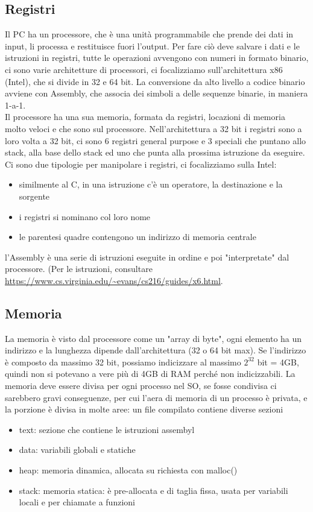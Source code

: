 \documentclass{article}
\begin{document}
\subsection{Registri}
Il PC ha un processore, che è una unità programmabile che prende dei dati in input, li processa e restituisce fuori l'output. Per fare ciò deve salvare i dati e le istruzioni in registri, tutte le operazioni avvengono con numeri in formato binario, ci sono varie architetture di processori, ci focalizziamo sull'architettura x86 (Intel), che si divide in 32 e 64 bit. La conversione da alto livello a codice binario avviene con Assembly, che associa dei simboli a delle sequenze binarie, in maniera 1-a-1.\\ Il processore ha una sua memoria, formata da registri, locazioni di memoria molto veloci e che sono sul processore. Nell'architettura a 32 bit i registri sono a loro volta a 32 bit, ci sono 6 registri general purpose e 3 speciali che puntano allo stack, alla base dello stack ed uno che punta alla prossima istruzione da eseguire. Ci sono due tipologie per manipolare i registri, ci focalizziamo sulla Intel: 
\begin{itemize}
\item similmente al C, in una istruzione c'è un operatore, la destinazione e la sorgente
\item i registri si nominano col loro nome
\item le parentesi quadre contengono un indirizzo di memoria centrale
\end{itemize}
l'Assembly è una serie di istruzioni eseguite in ordine e poi "interpretate" dal processore. (Per le istruzioni, consultare \url{https://www.cs.virginia.edu/~evans/cs216/guides/x6.html}.
\subsection{Memoria}
La memoria è visto dal processore come un "array di byte", ogni elemento ha un indirizzo e la lunghezza dipende dall'architettura (32 o 64 bit max). Se l'indirizzo è composto da massimo 32 bit, possiamo indicizzare al massimo $2^{32}$ bit = 4GB, quindi non si potevano a vere più di 4GB di RAM perché non indicizzabili. La memoria deve essere divisa per ogni processo nel SO, se fosse condivisa ci sarebbero gravi conseguenze, per cui l'aera di memoria di un processo è privata, e la porzione è divisa in molte aree: un file compilato contiene diverse sezioni
\begin{itemize}
\item text: sezione che contiene le istruzioni assembyl
\item data: variabili globali e statiche 
\item heap: memoria dinamica, allocata su richiesta con malloc()
\item stack: memoria statica: è pre-allocata e di taglia fissa, usata per variabili locali e per chiamate a funzioni
\end{itemize}
\end{document}
